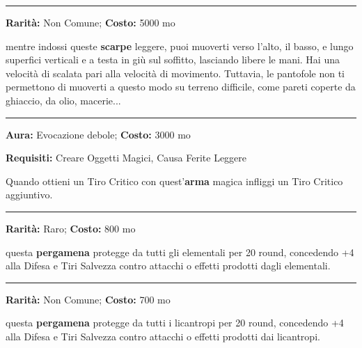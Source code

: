 \begin{multicols}{2}
\smallskip\noindent\rule{\linewidth}{2pt}  \hypertarget{PantofoledelRagno}{}\smallskip{}\noindent\label{PantofoledelRagno}

\textbf{Rarità:} Non Comune; \textbf{Costo:} 5000 mo

mentre indossi queste \textbf{scarpe} leggere, puoi muoverti verso l'alto, il basso, e lungo superfici verticali e a testa in giù sul soffitto, lasciando libere le mani. Hai una velocità di scalata pari alla velocità di movimento. Tuttavia, le pantofole non ti permettono di muoverti a questo modo su terreno difficile, come pareti coperte da ghiaccio, da olio, macerie...

\smallskip\noindent\rule{\linewidth}{2pt}  \hypertarget{Perfida}{}\smallskip{}\noindent\label{Perfida}

\textbf{Aura:} Evocazione debole; \textbf{Costo:} 3000 mo

\textbf{Requisiti:} Creare Oggetti Magici, Causa Ferite Leggere

Quando ottieni un Tiro Critico con quest'\textbf{arma} magica infliggi un Tiro Critico aggiuntivo.

\smallskip\noindent\rule{\linewidth}{2pt}  \hypertarget{Pergamenacontroglielementali}{}\smallskip{}\noindent\label{Pergamenacontroglielementali}

\textbf{Rarità:} Raro; \textbf{Costo:} 800 mo

questa \textbf{pergamena} protegge da tutti gli elementali per 20 round, concedendo +4 alla Difesa e Tiri Salvezza contro attacchi o effetti prodotti dagli elementali.

\smallskip\noindent\rule{\linewidth}{2pt}  \hypertarget{Pergamenacontroilicantropi}{}\smallskip{}\noindent\label{Pergamenacontroilicantropi}

\textbf{Rarità:} Non Comune; \textbf{Costo:} 700 mo

questa \textbf{pergamena} protegge da tutti i licantropi per 20 round, concedendo +4 alla Difesa e Tiri Salvezza contro attacchi o effetti prodotti dai licantropi.


\end{multicols}
